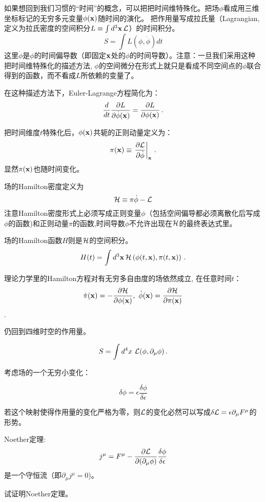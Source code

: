 \documentclass[CJK]{beamer}
\begin{document}
\begin{frame}
\bch
如果想回到我们习惯的“时间”的概念，可以把把时间维特殊化。把场$\phi$看成用三维坐标标记的无穷多元变量$\phi({\mathbf{x}})$随时间的演化。
把作用量写成拉氏量（Lagrangian, 定义为拉氏密度的空间积分$L \equiv \int d^3{\mathbf{x}}\, {\mathcal{L}}$）的时间积分。
$$S = \int L(\phi,\dot\phi) dt$$
这里$\dot\phi$是$\phi$的时间偏导数（即固定${\mathbf{x}}$处的$\phi$的时间导数）。注意：一旦我们采用这种把时间维特殊化的描述方法, $\phi$的空间微分在形式上就只是看成不同空间点的$\phi$联合得到的函数，而不看成$L$所依赖的变量了。

在这种描述方法下，Euler-Lagrange方程简化为：
$$\frac{d}{dt} \frac{\partial L}{\partial \dot\phi({\mathbf{x}})} = \frac{\partial L}{\partial \phi({\mathbf{x}})}\,.$$

\skipline

\ech
\end{frame}


\begin{frame}
\bch
把时间维度$t$特殊化后，$\phi({\mathbf{x}})$共轭的正则动量定义为：
$$ \pi({\mathbf{x}}) \equiv \left.\frac{\partial{\mathcal{L}}}{\partial\dot\phi}\right\vert_{{\mathbf{x}}} \,.$$
显然$\pi({\mathbf{x}})$也随时间变化。

场的Hamilton密度定义为
$$ {\mathcal{H}} \equiv \pi \dot\phi- {\mathcal{L}} $$
注意Hamilton密度形式上必须写成正则变量$\phi$（包括空间偏导都必须离散化后写成$\phi$的函数)和正则动量$\pi$的函数,时间导数$\dot\phi$不允许出现在${\mathcal{H}}$的最终表达式里。

场的Hamilton函数$H$则是${\mathcal{H}}$的空间积分。
$$ H(t) = \int d^3{\mathbf{x}}\, {\mathcal{H}}\left(\phi(t,{\mathbf{x}}), \pi(t,{\mathbf{x}})\right)\,.$$
\ech
\end{frame}

\begin{frame}
\bch
理论力学里的Hamilton方程对有无穷多自由度的场依然成立, 在任意时间$t$：
$$\dot\pi({\mathbf{x}}) = -\frac{\partial {\mathcal{H}}}{\partial\phi({\mathbf{x}})},\ \dot\phi({\mathbf{x}}) = \frac{\partial{\mathcal{H}}}{\partial\pi({\mathbf{x}})}$$.
\ech
\end{frame}

\begin{frame}
\bch
仍回到四维时空的作用量。

$$S = \int d^4x\ {\mathcal{L}}(\phi, \partial_\mu\phi)\,.$$

考虑场的一个无穷小变化：

$$\delta \phi = \epsilon \frac{\delta\phi}{\delta\epsilon}$$

若这个映射使得作用量的变化严格为零，则${\mathcal{L}}$的变化必然可以写成$ \delta {\mathcal{L}} = \epsilon \partial_\mu F^\mu$的形势。

Noether定理: $$j^\mu = F^\mu - \frac{\partial{\mathcal{L}}}{\partial (\partial_\mu\phi)} \frac{\delta\phi}{\delta\epsilon}$$ 是一个守恒流（即$\partial_\mu j^\mu = 0$)。

\ech
\end{frame}

\begin{frame}
\bch
{}
试证明Noether定理。
\ech
\end{frame}
\end{document}
